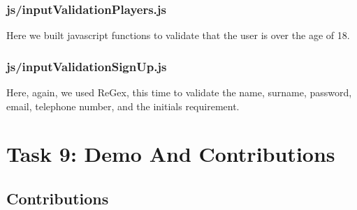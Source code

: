 \documentclass[titlepage]{article}
\begin{document}
\subsubsection{js/inputValidationPlayers.js}
Here we built javascript functions to validate that the user is over the age of 18. 
\vspace{1em}
\subsubsection{js/inputValidationSignUp.js}
Here, again, we used ReGex, this time to validate the name, surname, password, email, telephone number,
and the initials requirement.

\newpage


\section{Task 9: Demo And Contributions}
\vspace{1em}
\subsection{Contributions}
\vspace{1em}
\end{document}
